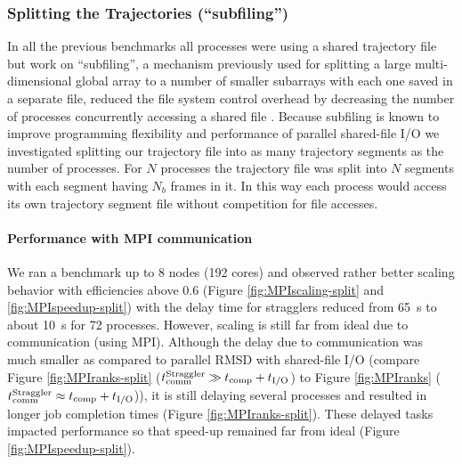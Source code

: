 \subsubsection{Splitting the Trajectories (``subfiling'')}
\label{splitting-traj}
In all the previous benchmarks all processes were using a shared trajectory file but work on ``subfiling'', a mechanism previously used for splitting a large multi-dimensional global array to a number of smaller subarrays with each one saved in a separate file, reduced the file system control overhead by decreasing the number of processes concurrently accessing a shared file \cite{scalable-IO, scalable-IO1}.
Because subfiling is known to improve programming flexibility and performance of parallel shared-file I/O we investigated splitting our trajectory file into as many trajectory segments as the number of processes.
For $N$ processes the trajectory file was split into $N$ segments with each segment having $N_{b}$ frames in it. 
In this way each  process would access its own trajectory segment file without competition for file accesses. 

\paragraph{Performance with MPI communication}
We ran a benchmark up to 8 nodes (192 cores) and observed rather better scaling behavior with efficiencies above 0.6 (Figure \ref{fig:MPIscaling-split} and \ref{fig:MPIspeedup-split}) with the delay time for stragglers reduced from 65~s to about 10~s for 72 processes. 
However, scaling is still far from ideal due to communication (using MPI). 
Although the delay due to communication was much smaller as compared to parallel RMSD with shared-file I/O (compare Figure \ref{fig:MPIranks-split} ($t_{\text{comm}}^{\text{Straggler}} \gg {t}_{\text{comp}}+{t}_{\text{I/O}}$) to Figure \ref{fig:MPIranks} ($t_{\text{comm}}^{\text{Straggler}} \approx {t}_{\text{comp}}+{t}_{\text{I/O}}$)), it is still delaying several processes and resulted in longer job completion times (Figure \ref{fig:MPIranks-split}). 
These delayed tasks impacted performance so that speed-up remained far from ideal (Figure \ref{fig:MPIspeedup-split}).

